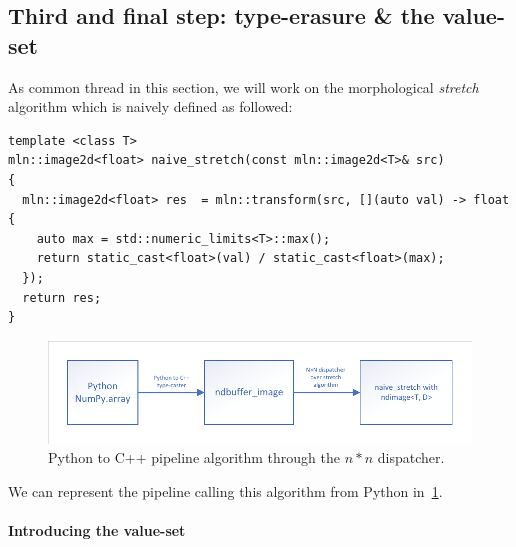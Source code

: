 \subsection{Third and final step: type-erasure \& the value-set}

As common thread in this section, we will work on the morphological \emph{stretch} algorithm which is naively defined as
followed:
\begin{verbatim}
template <class T>
mln::image2d<float> naive_stretch(const mln::image2d<T>& src)
{
  mln::image2d<float> res  = mln::transform(src, [](auto val) -> float {
    auto max = std::numeric_limits<T>::max();
    return static_cast<float>(val) / static_cast<float>(max);
  });
  return res;
}
\end{verbatim}

\begin{figure}[htbp]
  \centering
  \includegraphics[width=.8\linewidth]{figs/static_dynamic_bridge/nxndispatch_pipeline}
  \caption{Python to C++ pipeline algorithm through the $n*n$ dispatcher.}
  \label{fig:static_dyn.nxndispatcher}
\end{figure}

We can represent the pipeline calling this algorithm from Python in~\cref{fig:static_dyn.nxndispatcher}.

\paragraph{Introducing the value-set}


